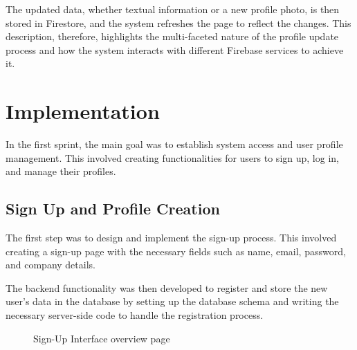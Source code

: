 The updated data, whether textual information or a new profile photo, is then stored in Firestore, and the system refreshes the page to reflect the changes. This description, therefore, highlights the multi-faceted nature of the profile update process and how the system interacts with different Firebase services to achieve it.


\section{Implementation}
In the first sprint, the main goal was to establish system access and user profile management. This involved creating functionalities for users to sign up, log in, and manage their profiles.

\subsection{Sign Up and Profile Creation} 

The first step was to design and implement the sign-up process. This involved creating a sign-up page with the necessary fields such as name, email, password, and company details.

The backend functionality was then developed to register and store the new user's data in the database by setting up the database schema and writing the necessary server-side code to handle the registration process.

\begin{figure}[H]
    \centering
    \caption{ Sign-Up Interface overview page}
    \label{fig:Sign-Up-Interface-overview-page}
\end{figure}

